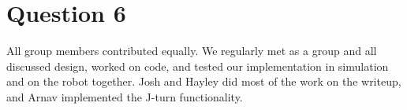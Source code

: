 \section{Question 6}

All group members contributed equally. We regularly met as a group and all discussed design, worked on code, and tested our implementation in simulation and on the robot together. Josh and Hayley did most of the work on the writeup, and Arnav implemented the J-turn functionality.